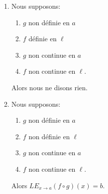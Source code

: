 \begin{theorem}
\begin{enumerate}
		\item   \label{ITEMooOAAVooSjoYOv}      %
		      Nous supposons:
		      \begin{multicols}{2}
			      \begin{enumerate}
				      \item \( g\) non définie en \( a\)
				      \item \( f\) définie en \( \ell\)
				      \item \( g\) non continue en \( a\)
				      \item \( f\) non continue en \( \ell\).
			      \end{enumerate}
		      \end{multicols}
		      Alors nous ne disons rien.
		\item   \label{ITEMooPVZKooBXJARI}      %
		      Nous supposons:
		      \begin{multicols}{2}
			      \begin{enumerate}
				      \item \( g\) non définie en \( a\)
				      \item \( f\) non définie en \( \ell\)
				      \item \( g\) non continue en \( a\)
				      \item \( f\) non continue en \( \ell\).
			      \end{enumerate}
		      \end{multicols}
		      Alors \( {LE}_{x\to a}(f\circ g)(x)=b\).
	\end{enumerate}
\end{theorem}

